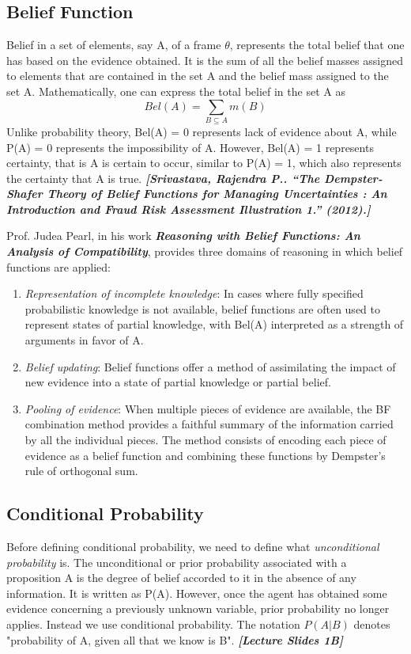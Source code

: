 \documentclass[UTF8]{article}
\newcommand{\mycite}[1]{\textbf{\textit{#1}}}
\begin{document}
\subsection{Belief Function}
Belief in a set of elements, say A, of a frame $\theta$, represents the total belief that one has
based on the evidence obtained. It is the sum of all the belief masses assigned to elements that
are contained in the set A and the belief mass assigned to the set A. Mathematically, one can
express the total belief in the set A as $$ Bel(A) = \sum_{B \subseteq A} m(B) $$ Unlike probability theory, Bel(A) = 0
represents lack of evidence about A, while P(A) = 0 represents the impossibility of A. However,
Bel(A) = 1 represents certainty, that is A is certain to occur, similar to P(A) = 1, which also
represents the certainty that A is true. \mycite{[Srivastava, Rajendra P.. “The Dempster-Shafer Theory of Belief Functions for Managing Uncertainties : An Introduction and Fraud Risk Assessment Illustration 1.” (2012).]}

Prof. Judea Pearl, in his work \mycite{Reasoning with Belief Functions: An Analysis of Compatibility}, provides three domains of reasoning in which belief functions are applied:
\begin{enumerate}[i]
    \item \textit{Representation of incomplete knowledge}: In cases where fully specified
    probabilistic knowledge is not available, belief functions are often used to
    represent states of partial knowledge, with Bel(A) interpreted as a strength
    of arguments in favor of A.
    \item  \textit{Belief updating}: Belief functions offer a method of assimilating the impact
    of new evidence into a state of partial knowledge or partial belief.
    \item \textit{Pooling of evidence}: When multiple pieces of evidence are available, the
    BF combination method provides a faithful summary of the information
    carried by all the individual pieces. The method consists of encoding each
    piece of evidence as a belief function and combining these functions by
    Dempster's rule of orthogonal sum.
\end{enumerate}
\subsection{Conditional Probability}
Before defining conditional probability, we need to define what \textit{unconditional probability} is. The unconditional or prior probability associated with a proposition A is the degree of belief accorded to it in the absence of any information. It is written as P(A).
However, once the agent has obtained some evidence concerning a previously unknown variable, prior probability no longer applies. Instead we use conditional probability. The notation $P(A|B)$ denotes "probability of A, given all that we know is B". \mycite{[Lecture Slides 1B]}
\end{document}
